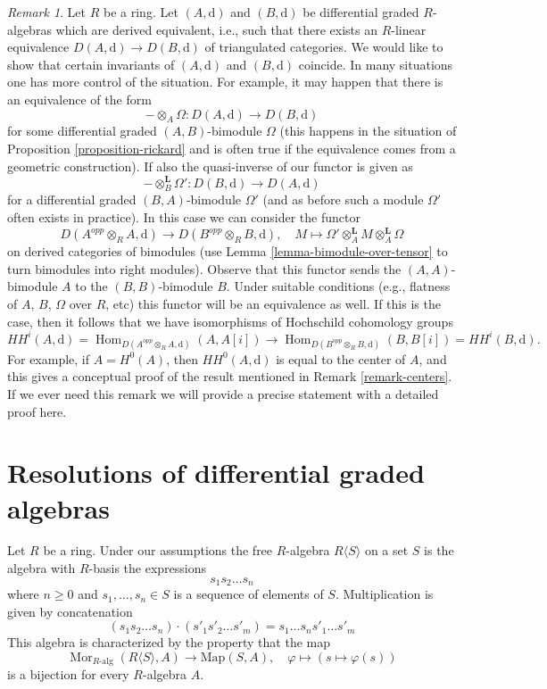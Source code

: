 \documentclass{stacks-project}
\theoremstyle{plain}
\theoremstyle{definition}
\theoremstyle{remark}
\newtheorem{remark}[subsection]{Remark}
\numberwithin{equation}{subsection}
\def\Hom{\mathop{\mathrm{Hom}}\nolimits}
\def\Mor{\mathop{\mathrm{Mor}}\nolimits}
\begin{document}
\begin{remark}
\label{remark-hochschild-cohomology}
Let $R$ be a ring. Let $(A, \text{d})$ and $(B, \text{d})$ be differential
graded $R$-algebras which are derived equivalent, i.e., such that there
exists an $R$-linear equivalence $D(A, \text{d}) \to D(B, \text{d})$
of triangulated categories. We would like to show that certain invariants
of $(A, \text{d})$ and $(B, \text{d})$ coincide. In many situations
one has more control of the situation. For example, it may happen
that there is an equivalence of the form
$$
- \otimes_A \Omega : D(A, \text{d}) \longrightarrow D(B, \text{d})
$$
for some differential graded $(A, B)$-bimodule
$\Omega$ (this happens in the situation of
Proposition \ref{proposition-rickard} and is often true
if the equivalence comes from a geometric construction).
If also the quasi-inverse of our functor is given as
$$
- \otimes_B^\mathbf{L} \Omega' : D(B, \text{d}) \longrightarrow D(A, \text{d})
$$
for a differential graded $(B, A)$-bimodule $\Omega'$
(and as before such a module $\Omega'$ often exists in practice).
In this case we can consider the functor
$$
D(A^{opp} \otimes_R A, \text{d})
\longrightarrow
D(B^{opp} \otimes_R B, \text{d}),\quad
M \longmapsto \Omega' \otimes^\mathbf{L}_A M \otimes_A^\mathbf{L} \Omega
$$
on derived categories of bimodules (use
Lemma \ref{lemma-bimodule-over-tensor} to turn bimodules into
right modules).
Observe that this functor sends the $(A, A)$-bimodule $A$ to
the $(B, B)$-bimodule $B$. Under suitable conditions
(e.g., flatness of $A$, $B$, $\Omega$ over $R$, etc)
this functor will be an equivalence as well.
If this is the case, then it follows that we have isomorphisms
of Hochschild cohomology groups
$$
HH^i(A, \text{d}) =
\Hom_{D(A^{opp} \otimes_R A, \text{d})}(A, A[i])
\longrightarrow
\Hom_{D(B^{opp} \otimes_R B, \text{d})}(B, B[i]) =
HH^i(B, \text{d}).
$$
For example, if $A = H^0(A)$, then $HH^0(A, \text{d})$
is equal to the center of $A$, and this gives a conceptual proof
of the result mentioned in Remark \ref{remark-centers}.
If we ever need this remark we will provide a precise statement
with a detailed proof here.
\end{remark}



\section{Resolutions of differential graded algebras}
\label{section-resolution-dgas}

\noindent
Let $R$ be a ring. Under our assumptions the free $R$-algebra
$R\langle S \rangle$ on a set $S$ is the algebra with $R$-basis
the expressions
$$
s_1 s_2 \ldots s_n
$$
where $n \geq 0$ and $s_1, \ldots, s_n \in S$ is a sequence of
elements of $S$. Multiplication is given by concatenation
$$
(s_1 s_2 \ldots s_n) \cdot (s'_1 s'_2 \ldots s'_m) =
s_1 \ldots s_n s'_1 \ldots s'_m
$$
This algebra is characterized by the property that the map
$$
\Mor_{R\text{-alg}}(R\langle S \rangle, A) \to
\text{Map}(S, A),\quad
\varphi \longmapsto (s \mapsto \varphi(s))
$$
is a bijection for every $R$-algebra $A$.
\end{document}
